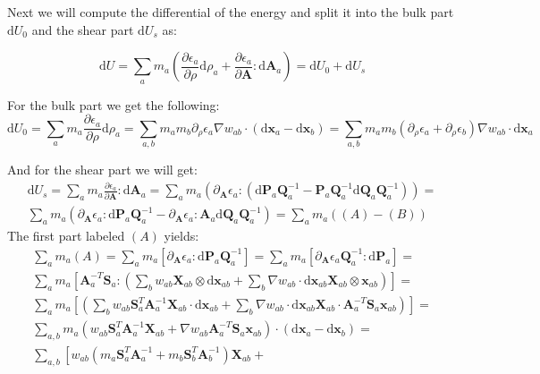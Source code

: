 \documentclass[oneside, a4paper, onecolumn, 11pt]{article}
\renewcommand{\AA}{\mathbf{A}}
\newcommand{\PP}{\mathbf{P}}
\newcommand{\xx}{\mathbf{x}}
\newcommand{\XX}{\mathbf{X}}
\newcommand{\diff}{\mathrm{d}}
\newcommand{\QQ}{\mathbf{Q}}
\renewcommand{\SS}{\mathbf{S}}
\newcommand{\pd}{\partial}
\begin{document}
\begin{section}
\begin{subsection}
Next we will compute the differential of the energy and split it into 
the bulk part $\diff U_{0}$ and the shear part $\diff U_s$ as: 

\[
    \diff U = \sum_{a} m_{a} \left( \frac{\pd \epsilon_a}{\pd \rho} \diff \rho_a + 
    \frac{\pd \epsilon_a}{\pd \AA}: \diff \AA_{a}\right) = \diff U_{0} + \diff U_{s}
\]

For the bulk part we get the following:
\[
    \diff U_{0} = \sum_{a} m_{a} \frac{\pd \epsilon_a}{\pd \rho} \diff \rho_{a}= 
    \sum_{a,b} m_{a} m_{b} \pd_{\rho} \epsilon_{a} \nabla w_{ab} \cdot 
    \left( \diff \xx_{a} - \diff \xx_{b} \right) =
    \sum_{a,b} m_{a} m_{b} \left( \pd_{\rho} \epsilon_{a} + \pd_{\rho} \epsilon_b \right) 
    \nabla w_{ab} \cdot \diff \xx_a
\]

And for the shear part we will get:
\[
    \begin{aligned}
    \diff U_{s} = \sum_{a} m_{a} \frac{\pd \epsilon_a}{\pd \AA}: \diff \AA_{a} = 
    \sum_{a} m_{a} \left( \pd_{\AA} \epsilon_{a} : \left( 
    \diff \PP_a \QQ_a^{-1} - \PP_a \QQ_a^{-1} \diff \QQ_a \QQ_a^{-1} \right)  \right) =\\
    \sum_{a} m_{a} \left( \pd_{\AA} \epsilon_{a} : 
    \diff \PP_a \QQ_a^{-1} - \pd_{\AA} \epsilon_{a} : \AA_{a} \diff \QQ_a \QQ_a^{-1} \right) = 
    \sum_{a} m_{a} \left( (A) - (B)  \right) 
    \end{aligned}
\]
The first part labeled $(A)$ yields:
\[
    \begin{aligned}
    \sum_{a} m_{a} (A) = \sum_{a} m_{a} \left[ \pd_{\AA} \epsilon_{a} : 
    \diff \PP_a \QQ_a^{-1} \right] = 
    \sum_{a} m_{a} \left[ \pd_{\AA} \epsilon_{a}  \QQ_a^{-1} :
    \diff \PP_a  \right] = \\
    \sum_{a} m_{a} \left[ \AA_a^{-T} \SS_{a}:
    \left( \sum_{b} w_{ab} \XX_{ab} \otimes \diff \xx_{ab} +
    \sum_{b} \nabla w_{ab} \cdot \diff \xx_{ab} \XX_{ab} 
    \otimes \xx_{ab} \right) \right] =\\
    \sum_{a} m_{a} \left[ \left( \sum_{b} w_{ab} \SS_a^{T} \AA_a^{-1} \XX_{ab} 
    \cdot \diff \xx_{ab} +
    \sum_{b} \nabla w_{ab} \cdot \diff \xx_{ab} \XX_{ab} 
    \cdot \AA_a^{-T} \SS_{a} \xx_{ab} \right) \right] =\\
    \sum_{a, b} m_{a} \left( w_{ab} \SS_a^{T} \AA_a^{-1} \XX_{ab} +
    \nabla w_{ab} 
    \AA_a^{-T} \SS_{a} \xx_{ab} \right) 
    \cdot \left( \diff \xx_{a}- \diff \xx_b \right)  =\\
    \sum_{a, b} \left[ w_{ab} \left( m_{a} \SS_a^{T} \AA_a^{-1} +
    m_{b} \SS_b^{T} \AA_b^{-1} \right) \XX_{ab} +

\end{aligned}\]
\end{subsection}
\end{section}
\end{document}
